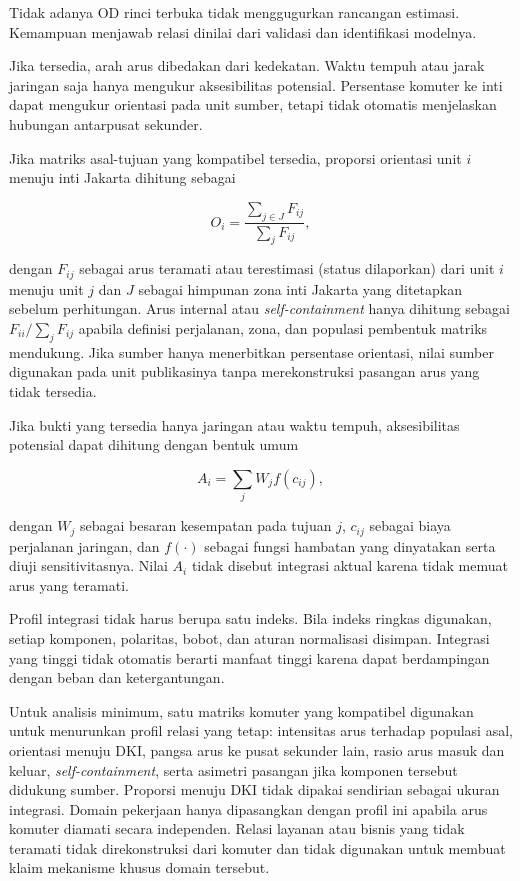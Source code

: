 \documentclass[11pt,a4paper,oneside,openany,indonesian]{report}
\begin{document}
Tidak adanya OD rinci terbuka tidak menggugurkan rancangan estimasi.
Kemampuan menjawab relasi dinilai dari validasi dan identifikasi
modelnya.

Jika tersedia, arah arus dibedakan dari kedekatan. Waktu tempuh atau
jarak jaringan saja hanya mengukur aksesibilitas potensial. Persentase
komuter ke inti dapat mengukur orientasi pada unit sumber, tetapi tidak
otomatis menjelaskan hubungan antarpusat sekunder.

Jika matriks asal-tujuan yang kompatibel tersedia, proporsi orientasi
unit \(i\) menuju inti Jakarta dihitung sebagai

\[
O_i = \frac{\sum_{j \in J} F_{ij}}{\sum_j F_{ij}},
\]

dengan \(F_{ij}\) sebagai arus teramati atau terestimasi (status
dilaporkan) dari unit \(i\) menuju unit \(j\) dan \(J\) sebagai himpunan
zona inti Jakarta yang ditetapkan sebelum perhitungan. Arus internal
atau \emph{self-containment} hanya dihitung sebagai
\(F_{ii}/\sum_j F_{ij}\) apabila definisi perjalanan, zona, dan populasi
pembentuk matriks mendukung. Jika sumber hanya menerbitkan persentase
orientasi, nilai sumber digunakan pada unit publikasinya tanpa
merekonstruksi pasangan arus yang tidak tersedia.

Jika bukti yang tersedia hanya jaringan atau waktu tempuh, aksesibilitas
potensial dapat dihitung dengan bentuk umum

\[
A_i = \sum_j W_j f(c_{ij}),
\]

dengan \(W_j\) sebagai besaran kesempatan pada tujuan \(j\), \(c_{ij}\)
sebagai biaya perjalanan jaringan, dan \(f(\cdot)\) sebagai fungsi
hambatan yang dinyatakan serta diuji sensitivitasnya. Nilai \(A_i\)
tidak disebut integrasi aktual karena tidak memuat arus yang teramati.

Profil integrasi tidak harus berupa satu indeks. Bila indeks ringkas
digunakan, setiap komponen, polaritas, bobot, dan aturan normalisasi
disimpan. Integrasi yang tinggi tidak otomatis berarti manfaat tinggi
karena dapat berdampingan dengan beban dan ketergantungan.

Untuk analisis minimum, satu matriks komuter yang kompatibel digunakan
untuk menurunkan profil relasi yang tetap: intensitas arus terhadap
populasi asal, orientasi menuju DKI, pangsa arus ke pusat sekunder lain,
rasio arus masuk dan keluar, \emph{self-containment}, serta asimetri
pasangan jika komponen tersebut didukung sumber. Proporsi menuju DKI
tidak dipakai sendirian sebagai ukuran integrasi. Domain pekerjaan hanya
dipasangkan dengan profil ini apabila arus komuter diamati secara
independen. Relasi layanan atau bisnis yang tidak teramati tidak
direkonstruksi dari komuter dan tidak digunakan untuk membuat klaim
mekanisme khusus domain tersebut.
\end{document}
